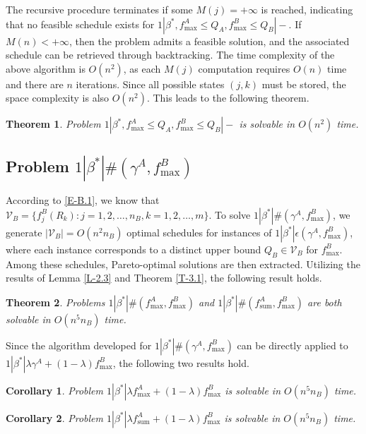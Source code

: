 \documentclass[12pt]{article}
\newtheorem{theorem}{Theorem}[section]
\newtheorem{cor}{Corollary}[section]
\begin{document}
\begin{sloppypar}
The recursive procedure terminates if some $M(j)=+\infty$ is reached, indicating that no feasible schedule exists for $1 | \beta^{*}, f_{\max}^A \leq Q_A, f_{\max}^B \leq Q_B |-$. If $M(n)<+\infty$, then the problem admits a feasible solution, and the associated schedule can be retrieved through backtracking. The time complexity of the above algorithm is $O(n^2)$, as each $M(j)$ computation requires $O(n)$ time and there are $n$ iterations. Since all possible states $(j,k)$ must be stored, the space complexity is also $O(n^2)$. This leads to the following theorem.

\begin{theorem} \label{T-3.3}
Problem $1 | \beta^{*}, f_{\max}^A \leq Q_A, f_{\max}^B \leq Q_B |-$ is solvable in $O(n^2)$ time.
\end{theorem}

\subsection{Problem $1 | \beta^{*} |\#(\gamma^A, f_{\max}^B)$}

According to \eqref{E-B.1}, we know that $\mathcal{V}_B=\{f_j^B(R_k): j=1, 2, \ldots, n_B, k=1, 2, \ldots, m\}$. To solve $1 | \beta^{*} |\#(\gamma^A, f_{\max}^B)$, we generate $|\mathcal{V}_B|=O(n^2 n_B)$ optimal schedules for instances of $1 | \beta^{*} |\epsilon(\gamma^{A}, f_{\max}^B)$, where each instance corresponds to a distinct upper bound $Q_B \in \mathcal{V}_B$ for $f_{\max}^B$. Among these schedules, Pareto-optimal solutions are then extracted. Utilizing the results of Lemma \ref{L-2.3} and Theorem \ref{T-3.1}, the following result holds.

\begin{theorem} \label{T-3.4}
Problems $1 | \beta^{*} |\#(f_{\max}^A, f_{\max}^B)$ and
$1 | \beta^{*} |\#(f_{\mathrm{sum}}^{A}, f_{\max}^B)$ are both solvable in $O(n^5 n_B)$ time.
\end{theorem} 

Since the algorithm developed for $1 | \beta^{*} |\#(\gamma^A, f_{\max}^B)$ can be directly applied to  $1 | \beta^{*} |\lambda \gamma^A +(1-\lambda) f_{\max}^B$, the following two results hold.

\begin{cor} \label{C-3.1}
Problem $1 | \beta^{*} |\lambda f_{\max}^A +(1-\lambda) f_{\max}^B$ is solvable in $O(n^5 n_B)$ time.
\end{cor}

\begin{cor} \label{C-3.2}
Problem $1 | \beta^{*} |\lambda f_{\mathrm{sum}}^A +(1-\lambda) f_{\max}^B$ is solvable in $O(n^5 n_B)$ time.
\end{cor}


\end{sloppypar}
\end{document}
